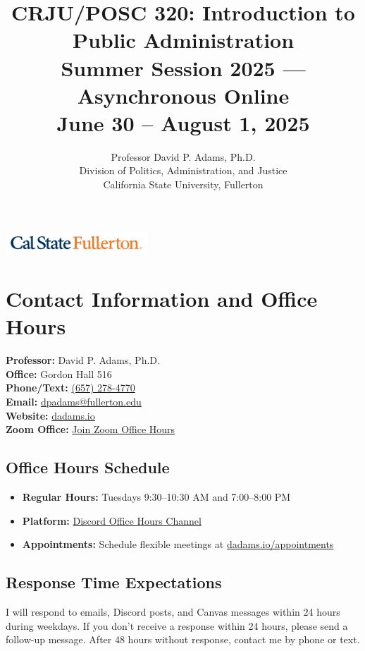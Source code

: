 \documentclass[11pt]{scrartcl} %
\title{\textbf{CRJU/POSC 320: Introduction to Public Administration}\\ 
       \large Summer Session 2025 --- Asynchronous Online\\
       \normalsize June 30 -- August 1, 2025}
\author{Professor David P. Adams, Ph.D.\\
        Division of Politics, Administration, and Justice\\
        California State University, Fullerton}
\date{}
\begin{document}
\maketitle

\begin{center}
\includegraphics[width=0.4\textwidth]{csuf_logo.png}
\end{center}

\section{Contact Information and Office Hours}

\textbf{Professor:} David P. Adams, Ph.D.\\
\textbf{Office:} Gordon Hall 516\\
\textbf{Phone/Text:} \href{tel:+16572784770}{(657) 278-4770}\\
\textbf{Email:} \href{mailto:dpadams@fullerton.edu}{dpadams@fullerton.edu}\\
\textbf{Website:} \href{https://dadams.io}{dadams.io}\\
\textbf{Zoom Office:} \href{https://fullerton.zoom.us/j/3347502369}{Join Zoom Office Hours}

\subsection{Office Hours Schedule}
\begin{itemize}
\item \textbf{Regular Hours:} Tuesdays 9:30--10:30 AM and 7:00--8:00 PM
\item \textbf{Platform:} \href{https://discord.com/channels/1128747433636135113/1154048074172354600}{Discord Office Hours Channel}
\item \textbf{Appointments:} Schedule flexible meetings at \href{https://dadams.io/appointments}{dadams.io/appointments}
\end{itemize}

\subsection{Response Time Expectations}
I will respond to emails, Discord posts, and Canvas messages within 24 hours during weekdays. If you don't receive a response within 24 hours, please send a follow-up message. After 48 hours without response, contact me by phone or text.
\end{document}
